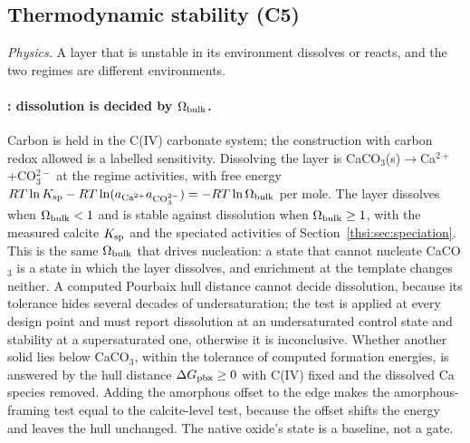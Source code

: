 \subsection{Thermodynamic stability (C5)}\label{thsi:sec:stability}

\textit{Physics.} A layer that is unstable in its environment dissolves or reacts, and the two regimes
are different environments.

\paragraph{\Rs: dissolution is decided by $\Omega_\mathrm{bulk}$.} Carbon is held in the C(IV) carbonate system; the
construction with carbon redox allowed is a labelled sensitivity. Dissolving the layer is
CaCO$_3$(s)$\to$Ca$^{2+}$+CO$_3^{2-}$ at the regime activities, with free energy
$R T\ln K_\mathrm{sp}-R T\ln(a_{\mathrm{Ca}^{2+}}a_{\mathrm{CO}_3^{2-}})=-R T\ln\Omega_\mathrm{bulk}$ per mole. The layer dissolves when $\Omega_\mathrm{bulk}<1$ and is
stable against dissolution when $\Omega_\mathrm{bulk}\ge1$, with the measured calcite $K_\mathrm{sp}$ and the speciated
activities of Section~\ref{thsi:sec:speciation}. This is the same $\Omega_\mathrm{bulk}$ that drives nucleation: a state
that cannot nucleate CaCO$_3$ is a state in which the layer dissolves, and enrichment at the template
changes neither. A computed Pourbaix hull distance cannot decide dissolution, because its tolerance hides several decades
of undersaturation; the test is applied at every design point and must report dissolution at an
undersaturated control state and stability at a supersaturated one, otherwise it is inconclusive. Whether
another solid lies below CaCO$_3$, within the tolerance of computed formation energies, is answered by the
hull distance $\Delta G_\mathrm{pbx}\ge0$ with C(IV) fixed and the dissolved Ca species removed. Adding the amorphous
offset to the edge makes the amorphous-framing test equal to the calcite-level test, because the offset
shifts the energy and leaves the hull unchanged. The native oxide's state is a baseline, not a gate.


